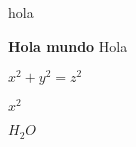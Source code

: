 \documentclass{book}
\begin{document}
\def\hola{hola}
\hola

{\bf Hola mundo} Hola 

$x^2 + y^2 = z^2$




$x^2$

$H_2O$

\end{document}
